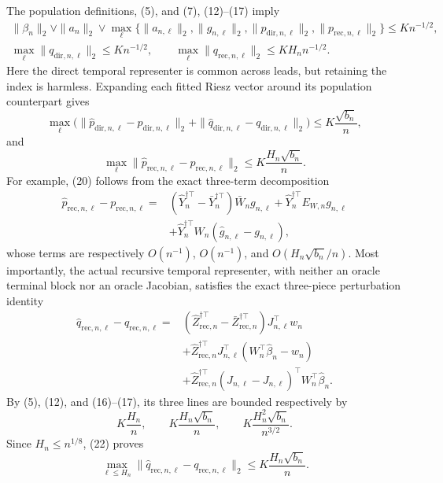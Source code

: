 The population definitions, (5), and (7), (12)--(17) imply
\[
\begin{gathered}
 \|\beta_n\|_2\vee\|a_n\|_2\vee
 \max_\ell\{\|a_{n,\ell}\|_2,\|g_{n,\ell}\|_2,
                 \|p_{\mathrm{dir},n,\ell}\|_2,
                 \|p_{\mathrm{rec},n,\ell}\|_2\}\le K n^{-1/2},\\
 \max_\ell\|q_{\mathrm{dir},n,\ell}\|_2\le K n^{-1/2},\qquad
 \max_\ell\|q_{\mathrm{rec},n,\ell}\|_2\le KH_n n^{-1/2}.
\end{gathered}
 \tag{18}
\]
Here the direct temporal representer is common across leads, but retaining the index is harmless.  Expanding each fitted Riesz vector around its population counterpart gives
\[
 \max_\ell\bigl(
 \|\widehat p_{\mathrm{dir},n,\ell}-p_{\mathrm{dir},n,\ell}\|_2+
 \|\widehat q_{\mathrm{dir},n,\ell}-q_{\mathrm{dir},n,\ell}\|_2\bigr)
 \le K\frac{\sqrt{b_n}}n,
 \tag{19}
\]
and
\[
 \max_\ell\|\widehat p_{\mathrm{rec},n,\ell}-p_{\mathrm{rec},n,\ell}\|_2
 \le K\frac{H_n\sqrt{b_n}}n.
 \tag{20}
\]
For example, (20) follows from the exact three-term decomposition
\[
\begin{aligned}
 \widehat p_{\mathrm{rec},n,\ell}-p_{\mathrm{rec},n,\ell}
={}&(\widehat Y_n^{\dagger\top}-\bar Y_n^{\dagger\top})\bar W_ng_{n,\ell}
 +\widehat Y_n^{\dagger\top}E_{W,n}g_{n,\ell}\\
 &+\widehat Y_n^{\dagger\top}W_n(\widehat g_{n,\ell}-g_{n,\ell}),
\end{aligned}
\]
whose terms are respectively \(O(n^{-1})\), \(O(n^{-1})\), and \(O(H_n\sqrt{b_n}/n)\).  Most importantly, the actual recursive temporal representer, with neither an oracle terminal block nor an oracle Jacobian, satisfies the exact three-piece perturbation identity
\[
\begin{aligned}
 \widehat q_{\mathrm{rec},n,\ell}-q_{\mathrm{rec},n,\ell}
={}&(\widehat Z_{\mathrm{rec},n}^{\dagger\top}
       -\bar Z_{\mathrm{rec},n}^{\dagger\top})J_{n,\ell}^{\top}w_n\\
 &+\widehat Z_{\mathrm{rec},n}^{\dagger\top}J_{n,\ell}^{\top}
      (W_n^\top\widehat\beta_n-w_n)\\
 &+\widehat Z_{\mathrm{rec},n}^{\dagger\top}
      (\widehat J_{n,\ell}-J_{n,\ell})^{\top}W_n^\top\widehat\beta_n .
\end{aligned}
 \tag{21}
\]
By (5), (12), and (16)--(17), its three lines are bounded respectively by
\[
 K\frac{H_n}{n},\qquad
 K\frac{H_n\sqrt{b_n}}n,\qquad
 K\frac{H_n^2\sqrt{b_n}}{n^{3/2}}.
 \tag{22}
\]
Since \(H_n\le n^{1/8}\), (22) proves
\[
 \max_{\ell\le H_n}
 \|\widehat q_{\mathrm{rec},n,\ell}-q_{\mathrm{rec},n,\ell}\|_2
 \le K\frac{H_n\sqrt{b_n}}n.
 \tag{23}
\]

